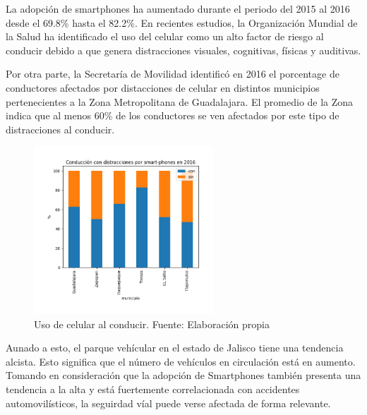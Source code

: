 \documentclass{article}
\begin{document}
La adopción de smartphones ha aumentado durante el periodo del 2015 al 2016 desde
el 69.8\% hasta el 82.2\%. En recientes estudios, la Organización Mundial de la Salud ha identificado
el uso del celular como un alto factor de riesgo al conducir debido a que genera distracciones
visuales, cognitivas, físicas y auditivas.

Por otra parte, la Secretaría de Movilidad identificó en 2016 el porcentage de conductores afectados
por distacciones de celular en distintos municipios pertenecientes a la Zona Metropolitana de Guadalajara.
El promedio de la Zona indica que al menos 60\% de los conductores se ven afectados por este tipo
de distracciones al conducir.

	\begin{figure}[H]\centering
	\includegraphics[width=0.6\textwidth]{resources/img/manejo_con_celular.png}
	\caption{\label{fig:manejo_celular} Uso de celular al conducir. Fuente: Elaboración propia}
    \end{figure}

Aunado a esto, el parque vehícular en el estado de Jalisco tiene una tendencia alcista. Esto significa que el número
de vehículos en circulación está en aumento. Tomando en consideración que la adopción de Smartphones
también presenta una tendencia a la alta y está fuertemente correlacionada con accidentes automovilísticos,
la seguirdad víal puede verse afectada de forma relevante.
\end{document}
